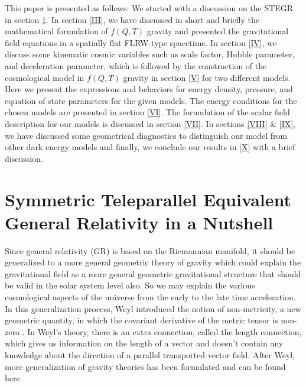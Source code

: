 \documentclass[showpacs,aps,amssymb,preprintnumbers,prd,amsmath,floatfix]{revtex4}
\begin{document}
This paper is presented as follows: We started with a discussion on the STEGR in section \ref{II}. In section \ref{III}, we have discussed in short and briefly the mathematical formulation of $f(Q,T)$ gravity and presented the gravitational field equations in a spatially flat FLRW-type spacetime. In section \ref{IV}, we discuss some kinematic cosmic variables such as scale factor, Hubble parameter, and deceleration parameter, which is followed by the construction of the cosmological model in $f(Q,T)$ gravity in section \ref{V} for two different models. Here we present the expressions and behaviors for energy density, pressure, and equation of state parameters for the given models. The energy conditions for the chosen models are presented in section \ref{VI}. The formulation of the scalar field description for our models is discussed in section \ref{VII}. In sections \ref{VIII} \& \ref{IX}, we have discussed some geometrical diagnostics to distinguish our model from other dark energy models and finally, we conclude our results in \ref{X} with a brief discussion.






\section{Symmetric Teleparallel Equivalent General Relativity in a Nutshell}\label{II}
Since general relativity (GR) is based on the Riemannian manifold, it should be generalized to a more general geometric theory of gravity which could explain the gravitational field as a more general geometric gravitational structure that should be valid in the solar system level also. So we may explain the various cosmological aspects of the universe from the early to the late time acceleration. In this generalization process, Weyl introduced the notion of non-metricity, a new geometric quantity, in which the covariant derivative of the metric tensor is non-zero \cite{Weyl/1918}. In Weyl's theory, there is an extra connection, called the length connection, which gives us information on the length of a vector and doesn't contain any knowledge about the direction of a parallel transported vector field. After Weyl, more generalization of gravity theories has been formulated and can be found here \cite{Di,Von,D,Z,M1,T,L,J,Z1,Z2}.
\end{document}
